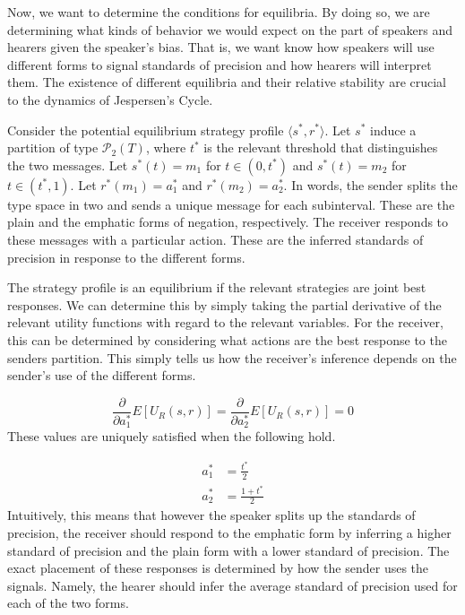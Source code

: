 \documentclass[12pt]{article}
\theoremstyle{definition} \newtheorem{definition}{Definition}
\begin{document}
Now, we want to determine the conditions for equilibria. By doing so, we are determining what kinds of behavior we would expect on the part of speakers and hearers given the speaker's bias. That is, we want know how speakers will use different forms to signal standards of precision and how hearers will interpret them. The existence of different equilibria and their relative stability are crucial to the dynamics of Jespersen's Cycle.

Consider the potential equilibrium strategy profile $\langle s^*, r^* \rangle$. Let $s^*$ induce a partition of type $\mathcal{P}_2(T)$, where $t^*$ is the relevant threshold that distinguishes the two messages. Let $s^*(t) = m_1$ for $t \in (0,t^*)$ and $s^*(t) = m_2$ for $t \in (t^*,1)$. Let $r^*(m_1) = a_1^*$ and $r^*(m_2) = a_2^*$. In words, the sender splits the type space in two and sends a unique message for each subinterval. These are the plain and the emphatic forms of negation, respectively. The receiver responds to these messages with a particular action.  These are the inferred standards of precision in response to the different forms.

The strategy profile is an equilibrium if the relevant strategies are joint best responses. We can determine this by simply taking the partial derivative of the relevant utility functions with regard to the relevant variables. For the receiver, this can be determined by considering what actions are the best response to the senders partition. This simply tells us how the receiver's inference depends on the sender's use of the different forms.

\begin{equation}
\frac{\partial}{\partial a_1^*}E[U_R(s, r)] = \frac{\partial}{\partial a_2^*}E[U_R(s, r)] = 0
\end{equation}
These values are uniquely satisfied when the following hold.

\begin{equation}
     \begin{split}
	  a_1^* &= \frac{t^*}{2}\\
	  a_2^* &= \frac{1 + t^*}{2}
     \end{split}
\end{equation}
Intuitively, this means that however the speaker splits up the standards of precision, the receiver should respond to the emphatic form by inferring a higher standard of precision and the plain form with a lower standard of precision. The exact placement of these responses is determined by how the sender uses the signals. Namely, the hearer should infer the average standard of precision used for each of the two forms.
\end{document}
